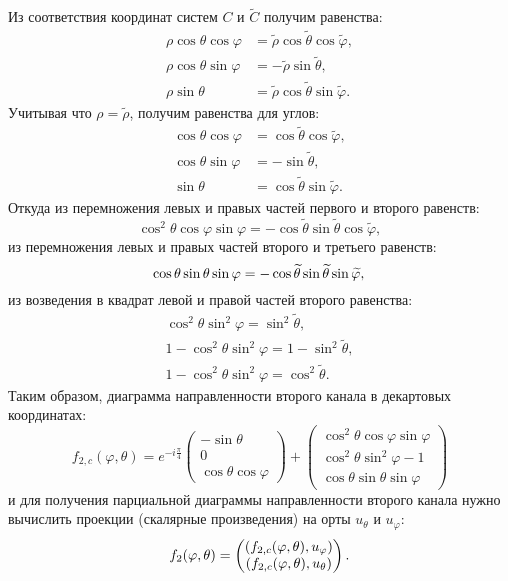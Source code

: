 Из соответствия координат систем $C$ и $\widetilde{C}$ получим равенства:
\begin{align*}
    \rho \cos \theta \cos \varphi & = \widetilde{\rho} \cos \widetilde{\theta} \cos \widetilde{\varphi} , \\
    \rho \cos \theta \sin \varphi & = - \widetilde{\rho} \sin \widetilde{\theta} ,                        \\
    \rho \sin \theta              & = \widetilde{\rho} \cos \widetilde{\theta} \sin \widetilde{\varphi} .
\end{align*}
Учитывая что $\rho = \widetilde{\rho}$, получим равенства для углов:
\begin{align*}
    \cos \theta \cos \varphi & = \cos \widetilde{\theta} \cos \widetilde{\varphi} , \\
    \cos \theta \sin \varphi & = - \sin \widetilde{\theta} ,                        \\
    \sin \theta              & = \cos \widetilde{\theta} \sin \widetilde{\varphi} .
\end{align*}
Откуда из перемножения левых и правых частей первого и второго равенств:
\[
    \cos^2 \theta \cos \varphi \sin \varphi = - \cos \widetilde{\theta} \sin \widetilde{\theta} \cos \widetilde{\varphi} ,
\]
из перемножения левых и правых частей второго и третьего равенств:
\[
    \cos \theta \sin \theta \sin \varphi = - \cos \widetilde{\theta} \sin \widetilde{\theta} \sin \widetilde{\varphi}, \\
\]
из возведения в квадрат левой и правой частей второго равенства:
\begin{gather*}
    \cos^2 \theta \sin^2 \varphi = \sin^2 \widetilde{\theta} , \\
    1 - \cos^2 \theta \sin^2 \varphi = 1 - \sin^2 \widetilde{\theta} , \\
    1 - \cos^2 \theta \sin^2 \varphi = \cos^2 \widetilde{\theta} .
\end{gather*}
Таким образом, диаграмма направленности второго канала в декартовых координатах:
\[
    f_{2,c}(\varphi, \theta)
    = e^{-i\frac{\pi}{4}}
    \begin{pmatrix}
        - \sin \theta \\
        0             \\
        \cos \theta \cos \varphi
    \end{pmatrix}
    + \begin{pmatrix}
        \cos^2 \theta \cos \varphi \sin \varphi \\
        \cos^2 \theta \sin^2 \varphi - 1        \\
        \cos \theta \sin \theta \sin \varphi
    \end{pmatrix}
\]
и для получения парциальной диаграммы направленности второго канала нужно вычислить проекции (скалярные произведения) на орты $u_\theta$ и $u_\varphi$:
\[
    f_2(\varphi, \theta)
    = \begin{pmatrix}
        \left ( f_{2,c}(\varphi, \theta), u_\varphi \right ) \\
        \left ( f_{2,c}(\varphi, \theta), u_\theta \right )
    \end{pmatrix} .
\]

